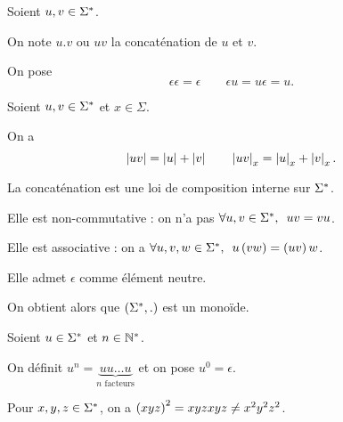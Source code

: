\begin{defi}[Concaténation]
Soient \(u,v\in\Sigma^{*}\).

On note \(u.v\) ou \(uv\) la concaténation de \(u\) et \(v\).

On pose \[\epsilon\epsilon=\epsilon\qquad\epsilon u=u\epsilon=u.\]
\end{defi}

\begin{prop}
Soient \(u,v\in\Sigma^{*}\) et \(x\in\Sigma\).

On a \[\left\lvert uv\right\rvert=\left\lvert u\right\rvert+\left\lvert v\right\rvert\qquad\left\lvert uv\right\rvert_x=\left\lvert u\right\rvert_x+\left\lvert v\right\rvert_x.\]
\end{prop}

\begin{rem}
La concaténation est une loi de composition interne sur \(\Sigma^{*}\).

Elle est non-commutative : on n'a pas \(\quantifs{\forall u,v\in\Sigma\etoile}uv=vu\).

Elle est associative : on a \(\quantifs{\forall u,v,w\in\Sigma\etoile}u\paren{vw}=\paren{uv}w\).

Elle admet \(\epsilon\) comme élément neutre.

On obtient alors que \(\groupe{\Sigma\etoile}[.]\) est un monoïde.
\end{rem}

\begin{defi}[Puissance]
Soient \(u\in\Sigma^{*}\) et \(n\in\mathbb{N}^*\).

On définit \(u^n=\underbrace{uu\dots u}_{n\text{ facteurs}}\) et on pose \(u^0=\epsilon\).
\end{defi}

\begin{rem}
Pour \(x,y,z\in\Sigma^{*}\), on a \(\left(xyz\right)^2=xyzxyz\not=x^2y^2z^2\).
\end{rem}

